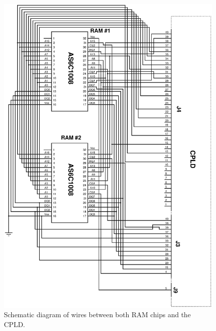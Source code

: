 \documentclass{article}
\begin{document}
\begin{figure}
\center
\includegraphics[scale=0.7]{figures/schematics/RAM_to_CPLD}
\caption{Schematic diagram of wires between both RAM chips and
the CPLD.}
\label{fig:ram_to_cpld}
\end{figure}
\end{document}
